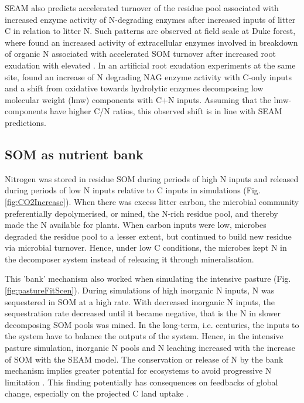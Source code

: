 SEAM also predicts accelerated turnover of the residue pool associated with
increased enzyme activity of N-degrading enzymes after increased inputs of
litter C in relation to litter N.
Such patterns are observed at field scale at Duke forest, where
\citet{Phillips11} found an increased activity of extracellular enzymes involved
in breakdown of organic N associated with accelerated SOM turnover after
increased root exudation with elevated . In an artificial
root exudation experiments at the same site, \citet{Drake13} found an increase of N
degrading NAG enzyme activity with C-only inputs and a shift from oxidative
towards hydrolytic enzymes decomposing low molecular weight (lmw) components
with C+N inputs.
Assuming that the lmw-components have higher C/N ratios, this observed shift
is in line with SEAM predictions.

\subsection{SOM as nutrient bank}
Nitrogen was stored in residue SOM during periods of high N inputs and released
during periods of low N inputs relative to C inputs in simulations (Fig.
\ref{fig:CO2Increase}). When there was excess litter carbon, the microbial
community preferentially depolymerised, or mined, the N-rich residue pool, and thereby
made the N available for plants. When carbon inputs were low, microbes degraded
the residue pool to a lesser extent, but continued to build new residue via
microbial turnover. Hence, under low C conditions, the microbes kept N in the
decomposer system instead of releasing it through mineralisation.

This 'bank' mechanism \citep[sensu][]{Perveen14} also worked when simulating the
intensive pasture (Fig. \ref{fig:pastureFitScen}). During simulations of high
inorganic N inputs, N was sequestered in SOM at a high rate. With decreased
inorganic N inputs, the sequestration rate decreased until it became negative,
that is the N in slower decomposing SOM pools was mined. In the
long-term, i.e.
centuries, the inputs to the system have to balance the outputs of the system. Hence, in
the intensive pasture simulation, inorganic N pools and N leaching increased with
the increase of SOM with the SEAM model. The conservation or release of N by the
bank mechanism implies greater potential for ecosystems to avoid progressive N
limitation \citep{Norby10, Franklin14, Averill15}. This finding
potentially has consequences on feedbacks of global change, especially on the
projected C land uptake \citep{Friedlingstein14}.

